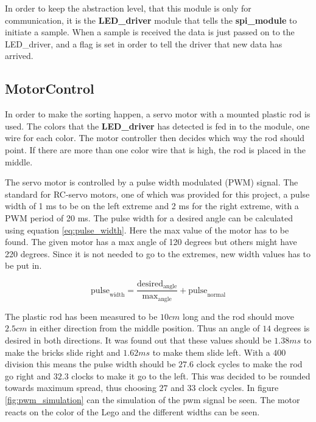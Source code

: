In order to keep the abstraction level, that this module is only for communication, it is the \textbf{LED\_driver} module that tells the \textbf{spi\_module} to initiate a sample. When a sample is received the data is just passed on to the LED\_driver, and a flag is set in order to tell the driver that new data has arrived.

\subsection{MotorControl}
In order to make the sorting happen, a servo motor with a mounted plastic rod is used. The colors that the \textbf{LED\_driver} has detected is fed in to the module, one wire for each color. The motor controller then decides which way the rod should point. If there are more than one color wire that is high, the rod is placed in the middle. 

The servo motor is controlled by a pulse width modulated (PWM) signal. The standard for RC-servo motors\cite[p. 917]{book:prac_ele}, one of which was provided for this project, a pulse width of 1 ms to be on the left extreme and 2 ms for the right extreme, with a PWM period of 20 ms. 
The pulse width for a desired angle can be calculated using equation \ref{eq:pulse_width}.
Here the max value of the motor has to be found.
The given motor has a max angle of 120 degrees but others might have 220 degrees.
Since it is not needed to go to the extremes, new width values has to be put in. 

\begin{equation}
 \text{pulse}_\text{width} = \frac{\text{desired}_{\text{angle}}}{\text{max}_{\text{angle}}}+\text{pulse}_{\text{normal}} \label{eq:pulse_width}
\end{equation}

The plastic rod has been measured to be $10 cm$ long and the rod should move $2.5 cm$ in either direction from the middle position.
Thus an angle of $14$ degrees is desired in both directions.
It was found out that these values should be $1.38 ms$ to make the bricks slide right and $1.62 ms$ to make them slide left.
With a $400$ division this means the pulse width should be $27.6$ clock cycles to make the rod go right and $32.3$ clocks to make it go to the left.
This was decided to be rounded towards maximum spread, thus choosing $27$ and $33$ clock cycles.
In figure \ref{fig:pwm_simulation} can the simulation of the pwm signal be seen.
The motor reacts on the color of the Lego and the different widths can be seen.

